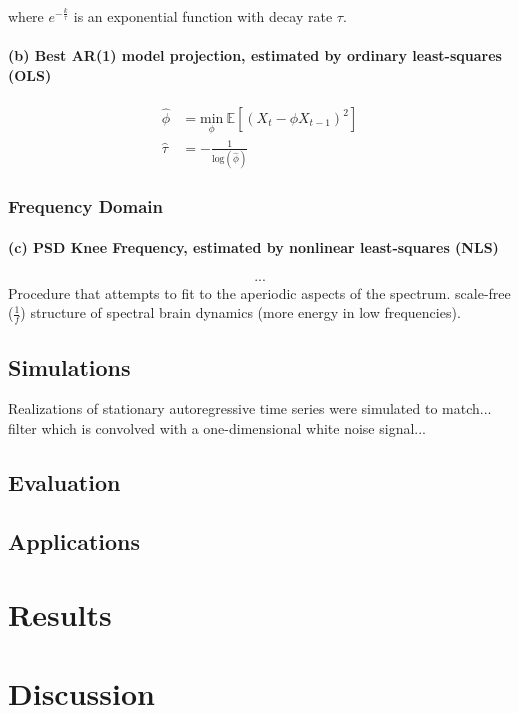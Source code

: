 \documentclass[10pt]{article}
\begin{document}
where $e^{-\frac{k}{\tau}}$ is an exponential function with decay rate $\tau$. 

\paragraph{(b) Best AR(1) model projection, estimated by ordinary least-squares (OLS)}
\begin{align*}
    \hat \phi &= \underset{\phi}{\text{min}} \ \mathbb{E}[(X_t - \phi X_{t-1})^2]\\
    \hat \tau &= -\frac{1}{\text{log}(\hat \phi)}
\end{align*}

\subsubsection*{Frequency Domain}
\paragraph{(c) PSD Knee Frequency, estimated by nonlinear least-squares (NLS)}
\begin{align*}
    ...
\end{align*}
Procedure that attempts to fit to the aperiodic aspects of the spectrum. scale-free ($\frac{1}{f}$) structure of spectral brain dynamics (more energy in low frequencies).

\subsection{Simulations}  
Realizations of stationary autoregressive time series were simulated to match...\\
filter which is convolved with a one-dimensional white noise signal...

\subsection{Evaluation}

\subsection{Applications}

\section{Results}

\section{Discussion}
\end{document}
